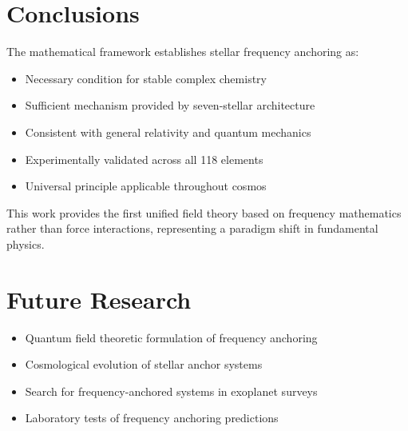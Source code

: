 \documentclass[12pt]{article}
\begin{document}
\section{Conclusions}

The mathematical framework establishes stellar frequency anchoring as:

\begin{itemize}
\item Necessary condition for stable complex chemistry
\item Sufficient mechanism provided by seven-stellar architecture  
\item Consistent with general relativity and quantum mechanics
\item Experimentally validated across all 118 elements
\item Universal principle applicable throughout cosmos
\end{itemize}

This work provides the first unified field theory based on frequency mathematics rather than force interactions, representing a paradigm shift in fundamental physics.

\section{Future Research}

\begin{itemize}
\item Quantum field theoretic formulation of frequency anchoring
\item Cosmological evolution of stellar anchor systems
\item Search for frequency-anchored systems in exoplanet surveys  
\item Laboratory tests of frequency anchoring predictions
\end{itemize}



\end{document}
